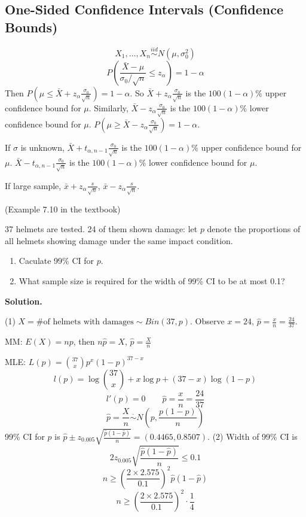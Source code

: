 \subsection{One-Sided Confidence Intervals (Confidence Bounds)}
\[X_1,\dots,X_n \overset{iid}{\sim} N(\mu,\sigma_0^2)\]
\[P\left(\frac{\bar{X}-\mu}{\sigma_0/\sqrt{n}} \leq z_{\alpha}\right)=1-\alpha\]
Then $P\left(\mu\leq \bar{X}+z_{\alpha}\frac{\sigma_0}{\sqrt{n}}\right)=1-\alpha$. So $\bar{X}+z_{\alpha}\frac{\sigma_0}{\sqrt{n}}$ is the $100(1-\alpha)\%$ upper confidence bound for $\mu$. Similarly, $\bar{X}-z_{\alpha}\frac{\sigma_0}{\sqrt{n}}$ is the $100(1-\alpha)\%$ lower confidence bound for $\mu$. $P\left(\mu\geq \bar{X}-z_{\alpha}\frac{\sigma_0}{\sqrt{n}}\right)=1-\alpha$.

If $\sigma$ is unknown, $\bar{X}+t_{\alpha,n-1}\frac{\sigma_0}{\sqrt{n}}$ is the $100(1-\alpha)\%$ upper confidence bound for $\mu$. $\bar{X}-t_{\alpha,n-1}\frac{\sigma_0}{\sqrt{n}}$ is the $100(1-\alpha)\%$ lower confidence bound for $\mu$.

If large sample, $\bar{x}+z_{\alpha}\frac{s}{\sqrt{n}}$, $\bar{x}-z_{\alpha}\frac{s}{\sqrt{n}}$.

\begin{exmp}
(Example 7.10 in the textbook)
\end{exmp}

\begin{exmp}
37 helmets are tested. 24 of them shown damage: let $p$ denote the proportions of all helmets showing damage under the same impact condition.
\begin{enumerate}
\item Caculate 99\% CI for $p$.
\item What sample size is required for the width of 99\% CI to be at most 0.1?
\end{enumerate}
\textbf{Solution.}

(1) $X=\text{\# of helmets with damages}\sim Bin(37,p)$.
Observe $x=24$, $\hat{p}=\frac{x}{n}=\frac{24}{37}$.

MM: $E(X)=np$, then $n\hat{p}=X$, $\hat{p}=\frac{X}{n}$

MLE: $L(p)= \binom {37}{x} p^x (1-p)^{37-x}$
\[l(p)=\log{\binom {37}{x}}+x \log{p}+(37-x)\log{(1-p)}\]
\[l'(p)=0 \qquad \hat{p}=\frac{x}{n}=\frac{24}{37}\]
\[\hat{p}=\frac{X}{n}\overset{\cdot}{\sim} N\left(p,\frac{p(1-p)}{n}\right)\]
99\% CI for $p$ is $\hat{p} \pm  z_{0.005} \sqrt{\frac{\hat{p}(1-\hat{p})}{n} }=(0.4465,0.8507) $.
(2) Width of 99\% CI is 
\[2 z_{0.005} \sqrt{\frac{\hat{p}(1-\hat{p})}{n} } \leq 0.1\]
\[n \geq \left(\frac{2\times 2.575}{0.1}\right)^2 \hat{p}(1-\hat{p})\]
\[n\geq \left(\frac{2\times 2.575}{0.1}\right)^2 \cdot\frac{1}{4}\]
\end{exmp}

